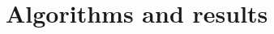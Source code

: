 \documentclass[final,12pt]{colt2018} %
\begin{document}

\section{Algorithms and results} \label{sec:mainresults}

%
\end{document}
